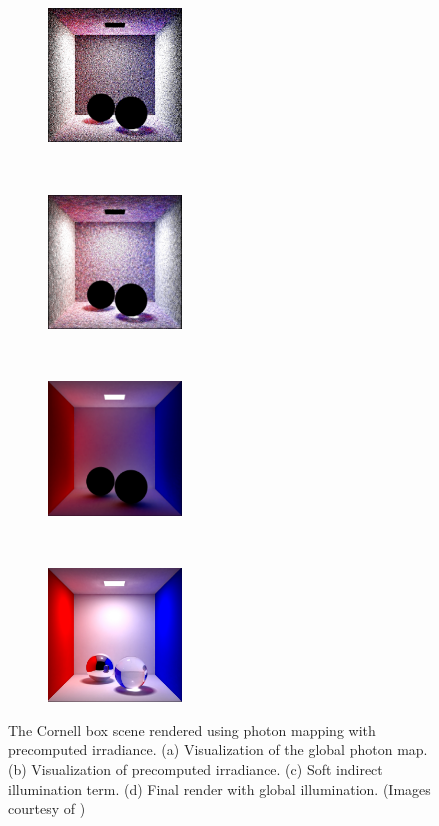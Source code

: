 \documentclass[]{book}
\begin{document}
\begin{figure}[!ht]
	\begin{subfigure}{0.24\textwidth}
		\includegraphics[height=1.4in]{img/PM-PMIC-0.png}
		\caption{ }
	\end{subfigure}%
	~
	\begin{subfigure}{0.24\textwidth}
		\includegraphics[height=1.4in]{img/PM-PMIC-1.png}
		\caption{ }
	\end{subfigure}%
	~
	\begin{subfigure}{0.24\textwidth}
		\includegraphics[height=1.4in]{img/PM-PMIC-2.png}
		\caption{ }
	\end{subfigure}%
	~
	\begin{subfigure}{0.24\textwidth}
		\includegraphics[height=1.4in]{img/PM-PMIC-3.png}
		\caption{ }
	\end{subfigure}
	\caption[Photon Mapping and Irradiance Caching]{The Cornell box scene rendered using photon mapping with precomputed irradiance. (a) Visualization of the global photon map. (b) Visualization of precomputed irradiance. (c) Soft indirect illumination term. (d) Final render with global illumination. (Images courtesy of \citeauthor{christensen1999faster})}
	\label{fig:PM:PMIC}
\end{figure}
\end{document}
